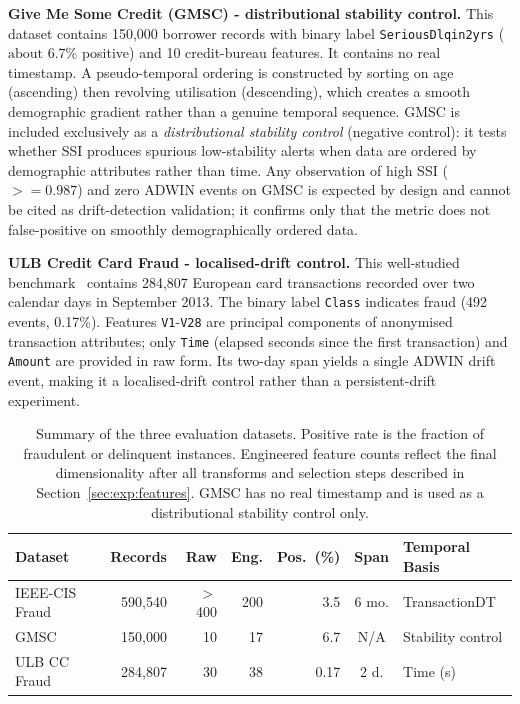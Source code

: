 \documentclass[pdflatex,sn-mathphys-num]{sn-jnl}
\theoremstyle{thmstyleone}
\theoremstyle{thmstyletwo}
\theoremstyle{thmstylethree}
\begin{document}
\textbf{Give Me Some Credit (GMSC) - distributional stability control.}
This dataset contains 150,000 borrower records with binary label
\texttt{SeriousDlqin2yrs} (${\text{about }}6.7$\% positive) and 10 credit-bureau
features. It contains no real timestamp. A pseudo-temporal ordering is
constructed by sorting on age (ascending) then revolving utilisation
(descending), which creates a smooth demographic gradient rather than a
genuine temporal sequence. GMSC is included exclusively as a
\emph{distributional stability control} (negative control): it tests
whether SSI produces spurious low-stability alerts when data are ordered by
demographic attributes rather than time. Any observation of high SSI
(${\mathrel{>=}}0.987$) and zero ADWIN events on GMSC is expected by design and
cannot be cited as drift-detection validation; it confirms only that the
metric does not false-positive on smoothly demographically ordered data.

\textbf{ULB Credit Card Fraud - localised-drift control.}
This well-studied benchmark~\cite{dalpozzolo2015ccfraud}
contains 284,807 European card transactions recorded over two calendar days in
September 2013. The binary label \texttt{Class} indicates fraud (492 events,
0.17\%). Features \texttt{V1}-\texttt{V28} are principal components of
anonymised transaction attributes; only \texttt{Time} (elapsed seconds since
the first transaction) and \texttt{Amount} are provided in raw form. Its
two-day span yields a single ADWIN drift event, making it a localised-drift
control rather than a persistent-drift experiment.

\begin{table}[t]
  \caption{Summary of the three evaluation datasets. Positive rate is the
           fraction of fraudulent or delinquent instances. Engineered feature
           counts reflect the final dimensionality after all transforms and
           selection steps described in Section~\ref{sec:exp:features}.
           GMSC has no real timestamp and is used as a distributional
           stability control only.}
  \label{tab:datasets}
  \centering\footnotesize
  \begin{tabular}{@{}lrrrrcl@{}}
    \toprule
    Dataset & Records & Raw & Eng. & Pos.\ (\%) & Span & Temporal Basis \\
    \midrule
    IEEE-CIS Fraud      & 590,540 & $>$400 & 200 & 3.5  & 6 mo. & TransactionDT \\
    GMSC                & 150,000 & 10     &  17 & 6.7  & N/A   & Stability control \\
    ULB CC Fraud        & 284,807 & 30     &  38 & 0.17 & 2 d.  & Time (s)      \\
    \bottomrule
  \end{tabular}
\end{table}
\end{document}
